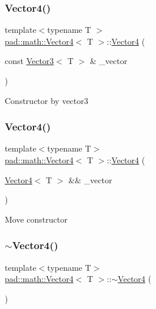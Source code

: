 \subsubsection{\texorpdfstring{Vector4()}{Vector4()}\hspace{0.1cm}{\footnotesize\ttfamily [6/7]}}
{\footnotesize\ttfamily template$<$typename T $>$ \\
\mbox{\hyperlink{structpad_1_1math_1_1_vector4}{pad\+::math\+::\+Vector4}}$<$ T $>$\+::\mbox{\hyperlink{structpad_1_1math_1_1_vector4}{Vector4}} (\begin{DoxyParamCaption}\item[{const \mbox{\hyperlink{structpad_1_1math_1_1_vector3}{Vector3}}$<$ T $>$ \&}]{\+\_\+vector }\end{DoxyParamCaption})}

Constructor by vector3 \mbox{\label{structpad_1_1math_1_1_vector4_acc4699e8164a36ac16bac91357f8e7cd}} 
\subsubsection{\texorpdfstring{Vector4()}{Vector4()}\hspace{0.1cm}{\footnotesize\ttfamily [7/7]}}
{\footnotesize\ttfamily template$<$typename T$>$ \\
\mbox{\hyperlink{structpad_1_1math_1_1_vector4}{pad\+::math\+::\+Vector4}}$<$ T $>$\+::\mbox{\hyperlink{structpad_1_1math_1_1_vector4}{Vector4}} (\begin{DoxyParamCaption}\item[{\mbox{\hyperlink{structpad_1_1math_1_1_vector4}{Vector4}}$<$ T $>$ \&\&}]{\+\_\+vector }\end{DoxyParamCaption})\hspace{0.3cm}{\ttfamily [default]}}

Move constructor \mbox{\label{structpad_1_1math_1_1_vector4_adf02f843943a3524de2add168b4d4903}} 
\subsubsection{\texorpdfstring{$\sim$\+Vector4()}{~Vector4()}}
{\footnotesize\ttfamily template$<$typename T$>$ \\
\mbox{\hyperlink{structpad_1_1math_1_1_vector4}{pad\+::math\+::\+Vector4}}$<$ T $>$\+::$\sim$\mbox{\hyperlink{structpad_1_1math_1_1_vector4}{Vector4}} (\begin{DoxyParamCaption}{ }\end{DoxyParamCaption})\hspace{0.3cm}{\ttfamily [default]}}

